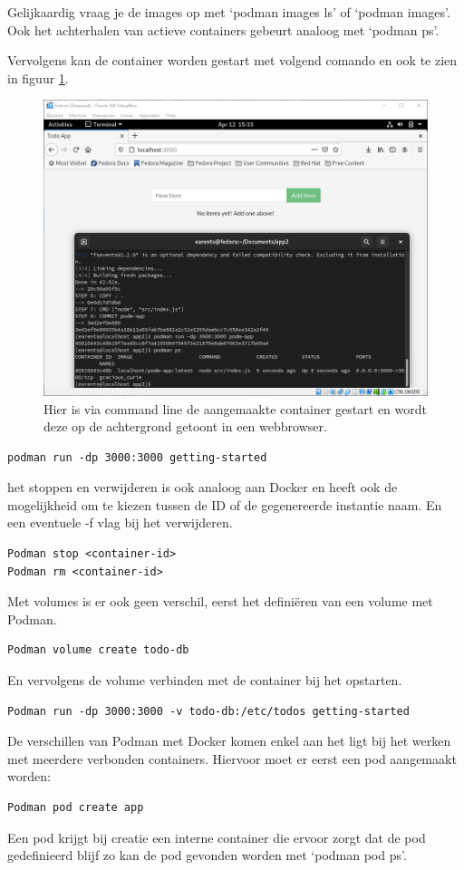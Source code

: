 Gelijkaardig vraag je de images op met `podman images ls' of `podman images'. Ook het achterhalen van actieve containers gebeurt analoog met `podman ps'.

Vervolgens kan de container worden gestart met volgend comando en ook te zien in figuur \ref{fig:podmanrun}. 
\begin{figure}[h]
    \includegraphics[width=\linewidth]{img/podmanrun.png}
    \caption[Podman die een web app uitvoert]{Hier is via command line de aangemaakte container gestart en wordt deze op de achtergrond getoont in een webbrowser.}
    \label{fig:podmanrun}
    \centering
\end{figure}
\begin{verbatim}
podman run -dp 3000:3000 getting-started
\end{verbatim}
het stoppen en verwijderen is ook analoog aan Docker en heeft ook de mogelijkheid om te kiezen tussen de ID of de gegenereerde instantie naam. En een eventuele -f vlag bij het verwijderen.
\begin{verbatim}
Podman stop <container-id>
Podman rm <container-id>
\end{verbatim}
Met volumes is er ook geen verschil, eerst het definiëren van een volume met Podman.
\begin{verbatim}
Podman volume create todo-db
\end{verbatim}
En vervolgens de volume verbinden met de container bij het opstarten.
\begin{verbatim}
Podman run -dp 3000:3000 -v todo-db:/etc/todos getting-started
\end{verbatim}
De verschillen van Podman met Docker komen enkel aan het ligt bij het werken met meerdere verbonden containers. Hiervoor moet er eerst een pod aangemaakt worden:
\begin{verbatim}
Podman pod create app
\end{verbatim}
Een pod krijgt bij creatie een interne container die ervoor zorgt dat de pod gedefinieerd blijf zo kan de pod gevonden worden met ‘podman pod ps’.

